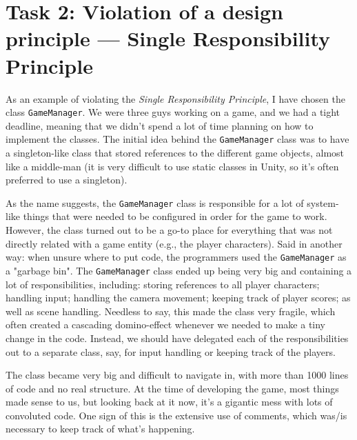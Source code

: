 \section*{Task 2: Violation of a design principle --- Single Responsibility Principle}
As an example of violating the \textit{Single Responsibility Principle}, I have chosen the class \texttt{GameManager}. We were three guys working on a game, and we had a tight deadline, meaning that we didn't spend a lot of time planning on how to implement the classes. The initial idea behind the \texttt{GameManager} class was to have a singleton-like class that stored references to the different game objects, almost like a middle-man (it is very difficult to use static classes in Unity, so it's often preferred to use a singleton).

As the name suggests, the \texttt{GameManager} class is responsible for a lot of system-like things that were needed to be configured in order for the game to work. However, the class turned out to be  a go-to place for everything that was not directly related with a game entity (e.g., the player characters). Said in another way: when unsure where to put code, the programmers used the \texttt{GameManager} as a "garbage bin". The \texttt{GameManager} class ended up being very big and containing a lot of responsibilities, including: storing references to all player characters; handling input; handling the camera movement; keeping track of player scores; as well as scene handling. Needless to say, this made the class very fragile, which often created a cascading domino-effect whenever we needed to make a tiny change in the code. Instead, we should have delegated each of the responsibilities out to a separate class, say, for input handling or keeping track of the players.

The class became very big and difficult to navigate in, with more than 1000 lines of code and no real structure. At the time of developing the game, most things made sense to us, but looking back at it now, it's a gigantic mess with lots of convoluted code. One sign of this is the extensive use of comments, which was/is necessary to keep track of what's happening.

